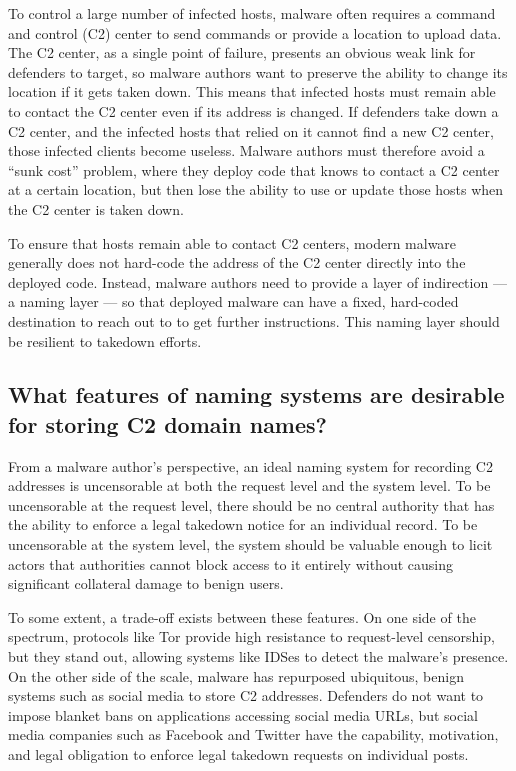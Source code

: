 \documentclass[10pt,sigconf,letterpaper]{acmart}
\newcommand{\randall}{\ding{110}\ding{43}\textcolor{magenta}}
\newcommand{\randall}{}
\begin{document}
To control a large number of infected hosts, malware often requires a command and control (C2) 
center 
to send commands or provide a location to upload data. 
The C2 center, as a single point of failure, presents an obvious weak link for defenders to target, 
so 
malware authors want to preserve the ability to change its location if it gets taken down. This 
means 
that infected hosts must remain able to contact the C2 center even if 
its address is changed. If defenders take down a C2 center, and the infected hosts that relied on 
it 
cannot find a new C2 center, those infected clients become useless. Malware authors must therefore 
avoid a ``sunk cost'' problem, where they deploy code that knows to contact a C2 center at a 
certain 
location, but then lose the ability to use or update those hosts when the C2 center is taken down.

To ensure that hosts remain able to contact C2 centers, modern malware generally does not hard-code 
the address of the C2 center directly into the deployed code. Instead, malware authors need to 
provide 
a layer of indirection --- a naming layer --- so that deployed malware can have a 
fixed, hard-coded destination to reach out to to get further instructions. 
This naming layer should be resilient to takedown efforts.

\subsection{What features of naming systems are desirable for storing C2 domain names?}

From a malware author's perspective, an ideal naming system for recording C2 
addresses is uncensorable at both the request level and the system level. To be 
uncensorable at the request level, there should be no central authority that 
has the ability to enforce a legal takedown notice for an individual record. To 
be uncensorable at the system level, the system should be valuable enough to 
licit actors that authorities cannot block access to it entirely without 
causing significant collateral damage to benign users.

To some extent, a trade-off exists between these features. On 
one side of the 
spectrum, protocols like Tor provide high resistance to request-level 
censorship, but they stand out, allowing systems like IDSes to detect the 
malware's presence.
On the other side of 
the scale, malware has repurposed ubiquitous, benign systems 
such as social media to store C2 addresses. Defenders do not 
want to impose blanket bans on applications accessing social 
media URLs, but social media companies such as Facebook and 
Twitter have the capability, motivation, and legal obligation to enforce 
legal takedown requests on individual posts. 
\end{document}
